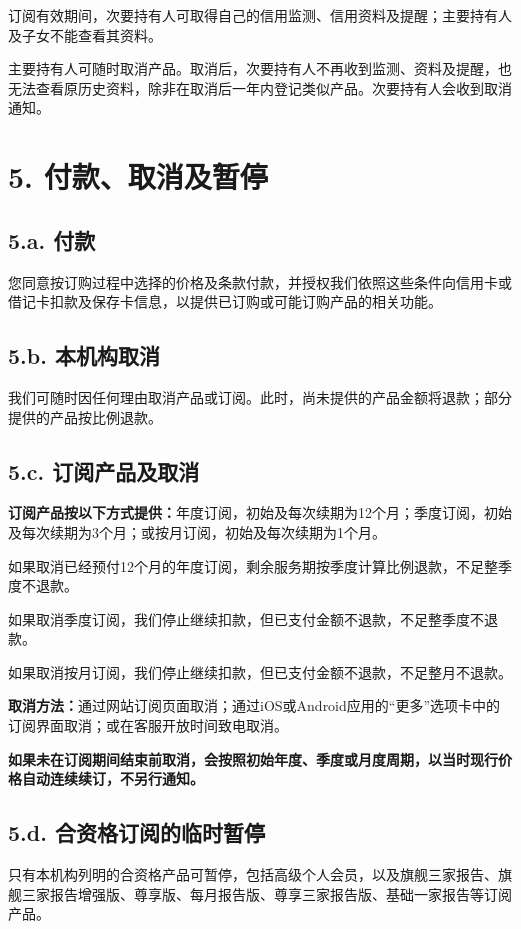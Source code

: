 \documentclass[UTF8,fontset=none,11pt,a4paper]{ctexart}
\begin{document}
订阅有效期间，次要持有人可取得自己的信用监测、信用资料及提醒；主要持有人及子女不能查看其资料。


主要持有人可随时取消产品。取消后，次要持有人不再收到监测、资料及提醒，也无法查看原历史资料，除非在取消后一年内登记类似产品。次要持有人会收到取消通知。


\section*{5. 付款、取消及暂停}
\subsection*{5.a. 付款}
您同意按订购过程中选择的价格及条款付款，并授权我们依照这些条件向信用卡或借记卡扣款及保存卡信息，以提供已订购或可能订购产品的相关功能。


\subsection*{5.b. 本机构取消}
我们可随时因任何理由取消产品或订阅。此时，尚未提供的产品金额将退款；部分提供的产品按比例退款。


\subsection*{5.c. 订阅产品及取消}
\textbf{订阅产品按以下方式提供：}年度订阅，初始及每次续期为12个月；季度订阅，初始及每次续期为3个月；或按月订阅，初始及每次续期为1个月。


如果取消已经预付12个月的年度订阅，剩余服务期按季度计算比例退款，不足整季度不退款。


如果取消季度订阅，我们停止继续扣款，但已支付金额不退款，不足整季度不退款。


如果取消按月订阅，我们停止继续扣款，但已支付金额不退款，不足整月不退款。


\textbf{取消方法：}通过网站订阅页面取消；通过iOS或Android应用的“更多”选项卡中的订阅界面取消；或在客服开放时间致电取消。


\textbf{如果未在订阅期间结束前取消，会按照初始年度、季度或月度周期，以当时现行价格自动连续续订，不另行通知。}


\subsection*{5.d. 合资格订阅的临时暂停}
只有本机构列明的合资格产品可暂停，包括高级个人会员，以及旗舰三家报告、旗舰三家报告增强版、尊享版、每月报告版、尊享三家报告版、基础一家报告等订阅产品。
\end{document}
